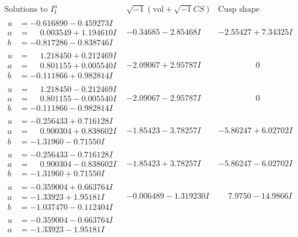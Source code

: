 \documentclass[1p]{elsarticle_modified}
\theoremstyle{definition}
\newcommand{\I}{\sqrt{-1}}
\begin{document}
$$\begin{array}{c|c|c}
\text{Solutions to }I^u_{1}& \I (\text{vol} + \sqrt{-1}CS) & \text{Cusp shape}\\
 \hline 
\begin{aligned}
u &= -0.616890 - 0.459273 I \\
a &= \phantom{-}0.003549 + 1.194610 I \\
b &= -0.817286 - 0.838746 I\end{aligned}
 & -0.34685 - 2.85468 I & -2.55427 + 7.34325 I \\ \hline\begin{aligned}
u &= \phantom{-}1.218450 + 0.212469 I \\
a &= \phantom{-}0.801155 + 0.005540 I \\
b &= -0.111866 + 0.982814 I\end{aligned}
 & -2.09067 + 2.95787 I & \phantom{-0.000000 } 0 \\ \hline\begin{aligned}
u &= \phantom{-}1.218450 - 0.212469 I \\
a &= \phantom{-}0.801155 - 0.005540 I \\
b &= -0.111866 - 0.982814 I\end{aligned}
 & -2.09067 - 2.95787 I & \phantom{-0.000000 } 0 \\ \hline\begin{aligned}
u &= -0.256433 + 0.716128 I \\
a &= \phantom{-}0.900304 + 0.838602 I \\
b &= -1.31960 - 0.71550 I\end{aligned}
 & -1.85423 - 3.78257 I & -5.86247 + 6.02702 I \\ \hline\begin{aligned}
u &= -0.256433 - 0.716128 I \\
a &= \phantom{-}0.900304 - 0.838602 I \\
b &= -1.31960 + 0.71550 I\end{aligned}
 & -1.85423 + 3.78257 I & -5.86247 - 6.02702 I \\ \hline\begin{aligned}
u &= -0.359004 + 0.663764 I \\
a &= -1.33923 + 1.95181 I \\
b &= -1.037470 - 0.112404 I\end{aligned}
 & -0.006489 - 1.319230 I & \phantom{-}7.9750 - 14.9866 I \\ \hline\begin{aligned}
u &= -0.359004 - 0.663764 I \\
a &= -1.33923 - 1.95181 I \\

\end{aligned}
\end{array}$$
\end{document}
